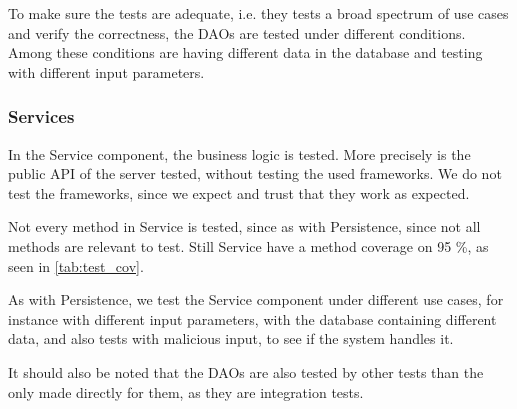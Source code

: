 To make sure the tests are adequate, i.e. they tests a broad spectrum of use cases and verify the correctness,
the \acp{DAO} are tested under different conditions.
Among these conditions are having different data in the database and testing with different input parameters.

\subsubsection{Services}
In the Service component, the business logic is tested.
More precisely is the public \ac{API} of the server tested, without testing the used frameworks.
We do not test the frameworks, since we expect and trust that they work as expected.

Not every method in Service is tested, since as with Persistence, since not all methods are relevant to test.
Still Service have a method coverage on 95 \%, as seen in \cref{tab:test_cov}.

As with Persistence, we test the Service component under different use cases, for instance with different input parameters,
with the database containing different data, and also tests with malicious input, to see if the system handles it.

It should also be noted that the \acp{DAO} are also tested by other tests than the only made directly for them, 
as they are integration tests.

